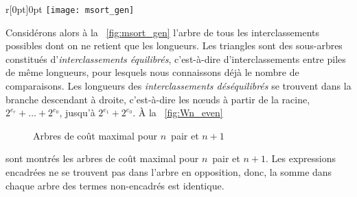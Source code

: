\begin{wrapfigure}[9]{r}[0pt]{0pt}
\centering
\texttt{[image: msort\_gen]}%
\caption{\(\sum_{j=0}^{r}2^{e_j}\) clés}
\label{fig:msort_gen}
\end{wrapfigure}
Considérons alors à la \fig~\ref{fig:msort_gen} l'arbre de tous les
interclassements possibles
dont on ne retient que les longueurs. Les triangles sont des
sous-arbres constitués d'\emph{interclassements équilibrés},
c'est-à-dire d'interclassements entre piles de même longueurs, pour
lesquels nous connaissons déjà le nombre de comparaisons. Les
longueurs des \emph{interclassements déséquilibrés} se trouvent dans
la branche descendant à droite, c'est-à-dire les nœuds à partir de
la racine, \(2^{e_r}+ \dots + 2^{e_0}\), jusqu'à \(2^{e_1} +
2^{e_0}\). À la
\fig~\vref{fig:Wn_even}
\begin{figure}[b]
\centering
{} %
\qquad
{}
\caption{Arbres de coût maximal pour \(n\)~pair et \(n+1\)}
\label{fig:Wn_even}
\end{figure}
sont montrés les arbres de coût maximal pour \(n\)~pair et
\(n+1\). Les expressions encadrées ne se trouvent pas dans l'arbre en
opposition, donc, la somme dans chaque arbre des termes non-encadrés
est identique.

